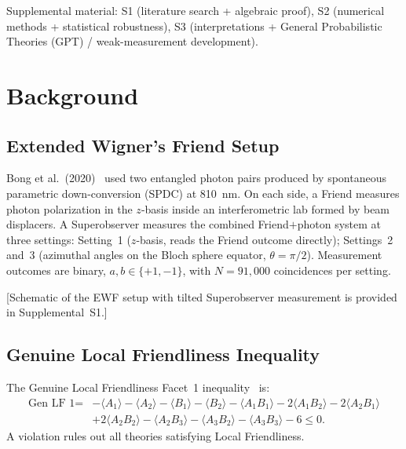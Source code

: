 \documentclass[twocolumn,aps,pra,superscriptaddress,floatfix,10pt]{revtex4-2}
\begin{document}
Supplemental material: S1 (literature search + algebraic proof), S2
(numerical methods + statistical robustness), S3 (interpretations +
General Probabilistic Theories (GPT) / weak-measurement development).

\section{Background}
\label{sec:background}

\subsection{Extended Wigner's Friend Setup}
\label{sec:ewf}

Bong et al.\ (2020)~\cite{Bong2020} used two entangled photon pairs produced by spontaneous
parametric down-conversion (SPDC) at 810~nm. On each side, a Friend measures
photon polarization in the $z$-basis inside an interferometric lab formed by beam
displacers. A Superobserver measures the combined Friend$+$photon system at three
settings: Setting~1 ($z$-basis, reads the Friend outcome directly); Settings~2 and~3
(azimuthal angles on the Bloch sphere equator, $\theta = \pi/2$). Measurement outcomes
are binary, $a, b \in \{+1, -1\}$, with $N = 91{,}000$ coincidences per setting.

[Schematic of the EWF setup with tilted Superobserver measurement is provided in Supplemental~S1.]

\subsection{Genuine Local Friendliness Inequality}
\label{sec:gen_lf}

The Genuine Local Friendliness Facet~1 inequality~\cite{Bong2020} is:
\begin{equation}
\begin{split}
\text{Gen LF 1} = & -\langle A_1\rangle - \langle A_2\rangle
- \langle B_1\rangle - \langle B_2\rangle - \langle A_1 B_1\rangle
- 2\langle A_1 B_2\rangle - 2\langle A_2 B_1\rangle \\
& + 2\langle A_2 B_2\rangle - \langle A_2 B_3\rangle
- \langle A_3 B_2\rangle - \langle A_3 B_3\rangle - 6 \le 0.
\end{split}
\label{eq:gen_lf1}
\end{equation}
A violation rules out all theories satisfying Local Friendliness.
\end{document}
